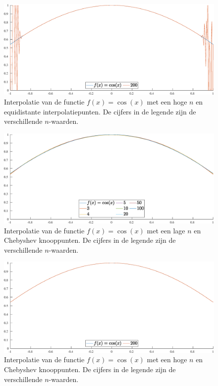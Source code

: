 \documentclass[a4paper, 12pt, titlepage, fleqn]{article}
\begin{document}
\begin{figure}
\centering
\includegraphics[scale=0.4]{../Afbeeldingen/cos_equi_hoog.eps}
\caption[Cosinus interpolatie, veel equidistante interpolatiepunten]{Interpolatie van de functie $f(x) = \cos(x)$ met een hoge $n$ en equidistante interpolatiepunten. De cijfers in de legende zijn de verschillende $n$-waarden.}
\label{fig:hogeNCosEqui}
\end{figure}

\begin{figure}
\centering
\includegraphics[scale=0.4]{../Afbeeldingen/cos_nul_laag.eps}
\caption[Cosinus interpolatie, weinig Chebyshev knooppunten ]{Interpolatie van de functie $f(x) = \cos(x)$ met een lage $n$ en Chebyshev knooppunten. De cijfers in de legende zijn de verschillende $n$-waarden.}
\label{fig:lageNCosNul}
\end{figure}

\begin{figure}
\centering
\includegraphics[scale=0.4]{../Afbeeldingen/cos_nul_hoog.eps}
\caption[Cosinus interpolatie, veel Chebyshev knooppunten ]{Interpolatie van de functie $f(x) = \cos(x)$ met een hoge $n$ en Chebyshev knooppunten. De cijfers in de legende zijn de verschillende $n$-waarden.}
\label{fig:hogeNCosNul}
\end{figure}
\end{document}

